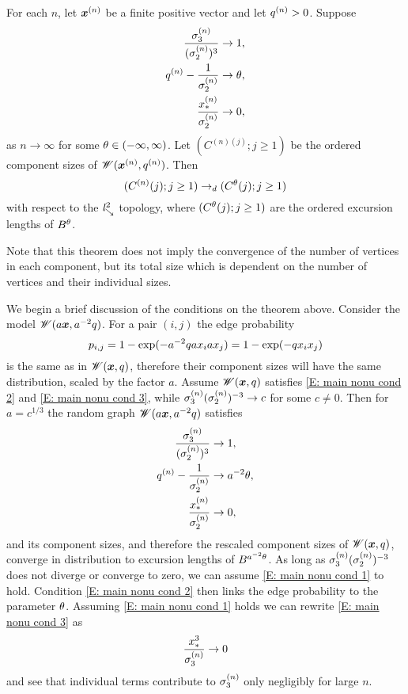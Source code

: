 \begin{theorem} \label{T: Main nonuniform}
	For each $n$, let $\boldsymbol{x}^{(n)}$ be a finite positive vector and let $q^{(n)} > 0$.
	Suppose
	\begin{align}
		\frac{\sigma^{(n)}_3}{(\sigma^{(n)}_2)^3} &\rightarrow 1, \label{E: main nonu cond 1} \\ 
		q^{(n)} - \frac{1}{\sigma^{(n)}_2} &\rightarrow \theta, \label{E: main nonu cond 2} \\ 
		\frac{x_*^{(n)}}{\sigma^{(n)}_2} &\rightarrow 0, \label{E: main nonu cond 3}
	\end{align}
	as $n \rightarrow \infty$ for some $\theta \in (-\infty, \infty)$.
	Let $(C^{(n)(j)}; j \geq 1)$ be the ordered component sizes of $\mathscr{W}(\boldsymbol{x}^{(n)}, q^{(n)})$.
	Then
	\begin{equation}
		(C^{(n)}(j); j \geq 1) \rightarrow_d (C^{\theta}(j); j \geq 1)
	\end{equation}
	with respect to the $\mathit{l}^2_{\searrow}$ topology, where $(C^{\theta}(j); j \geq 1)$ are the ordered excursion lengths of $B^{\theta}$.
\end{theorem}

Note that this theorem does not imply the convergence of the number of vertices in each component,
but its total size which is dependent on the number of vertices and their individual sizes.

We begin a brief discussion of the conditions on the theorem above.
Consider the model $\mathscr{W}(a\boldsymbol{x}, a^{-2}q)$.
For a pair $(i,j)$ the edge probability
\begin{equation}
	p_{i,j} = 1 - \exp(-a^{-2}q ax_iax_j) = 1 - \exp(-q x_ix_j)
\end{equation}
is the same as in $\mathscr{W}(\boldsymbol{x}, q)$,
therefore their component sizes will have the same distribution,
scaled by the factor $a$.
Assume $\mathscr{W}(\boldsymbol{x}, q)$ satisfies \eqref{E: main nonu cond 2} and \eqref{E: main nonu cond 3},
while $\sigma^{(n)}_3(\sigma^{(n)}_2)^{-3} \rightarrow c$ for some $c \neq 0$.
Then for $a = c^{1/3}$ the random graph $\mathscr{W}(a\boldsymbol{x}, a^{-2}q)$ satisfies
\begin{equation}
	\begin{aligned}
	\frac{\sigma^{(n)}_3}{(\sigma^{(n)}_2)^3} &\rightarrow 1, \\ 
	q^{(n)} - \frac{1}{\sigma^{(n)}_2} &\rightarrow a^{-2}\theta, \\
	\frac{x_*^{(n)}}{\sigma^{(n)}_2} &\rightarrow 0,
	\end{aligned}
\end{equation}
and its component sizes,
and therefore the rescaled component sizes of $\mathscr{W}(\boldsymbol{x}, q)$,
converge in distribution to excursion lengths of $B^{a^{-2}\theta}$.
As long as $\sigma^{(n)}_3(\sigma^{(n)}_2)^{-3}$ does not diverge or converge to zero,
we can assume \eqref{E: main nonu cond 1} to hold.
Condition \eqref{E: main nonu cond 2} then links the edge probability to the parameter $\theta$.
Assuming \eqref{E: main nonu cond 1} holds we can rewrite \eqref{E: main nonu cond 3} as
\begin{equation}
	\frac{x_*^3}{\sigma^{(n)}_3} \rightarrow 0
\end{equation}
and see that individual terms contribute to $\sigma^{(n)}_3$ only negligibly for large $n$.

